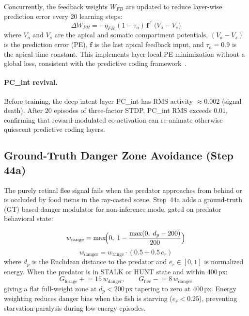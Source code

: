 \documentclass[11pt,a4paper]{article}
\begin{document}
Concurrently, the feedback weights $W_{FB}$ are updated to reduce
layer-wise prediction error every 20 learning steps:
\begin{equation}
  \Delta W_{FB} = -\eta_{FB} \,(1 - \tau_a)\,
    \mathbf{f}^\top\, \bigl(V_a - V_s\bigr)
\end{equation}
where $V_a$ and $V_s$ are the apical and somatic compartment potentials,
$(V_a - V_s)$ is the prediction error (PE), $\mathbf{f}$ is the last
apical feedback input, and $\tau_a = 0.9$ is the apical time constant.
This implements layer-local PE minimization without a global loss, consistent
with the predictive coding framework~\cite{rao1999}.

\paragraph{PC\_int revival.}
Before training, the deep intent layer PC\_int has RMS activity $\approx 0.002$
(signal death).  After 20 episodes of three-factor STDP, PC\_int RMS exceeds
$0.01$, confirming that reward-modulated co-activation can re-animate
otherwise quiescent predictive coding layers.

\subsection{Ground-Truth Danger Zone Avoidance (Step 44a)}\label{sec:danger_zone}

The purely retinal flee signal fails when the predator approaches from behind
or is occluded by food items in the ray-casted scene.  Step~44a adds a
ground-truth (GT) based danger modulator for non-inference mode, gated on
predator behavioral state:

\begin{equation}
  w_{\text{range}} = \max\!\Bigl(0,\; 1 - \frac{\max(0,\;d_p - 200)}{200}\Bigr)
\end{equation}
\begin{equation}
  w_{\text{danger}} = w_{\text{range}} \cdot (0.5 + 0.5\,e_r)
\end{equation}
where $d_p$ is the Euclidean distance to the predator and
$e_r \in [0,1]$ is normalized energy.
When the predator is in STALK or HUNT state and within 400\,px:
\[
  G_{\text{forage}} \mathrel{+}= 15\,w_{\text{danger}}, \qquad
  G_{\text{flee}}   \mathrel{-}= 8\,w_{\text{danger}}
\]
giving a flat full-weight zone at $d_p < 200$\,px tapering to zero at
$400$\,px.  Energy weighting reduces danger bias when the fish is starving
($e_r < 0.25$), preventing starvation-paralysis during low-energy episodes.
\end{document}
